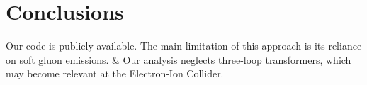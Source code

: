 \section{Conclusions}\label{sec:conclusions}

Our code is publicly available. The main limitation of this approach is
its reliance on soft gluon emissions. & Our analysis neglects three-loop
transformers, which may become relevant at the Electron-Ion Collider.

